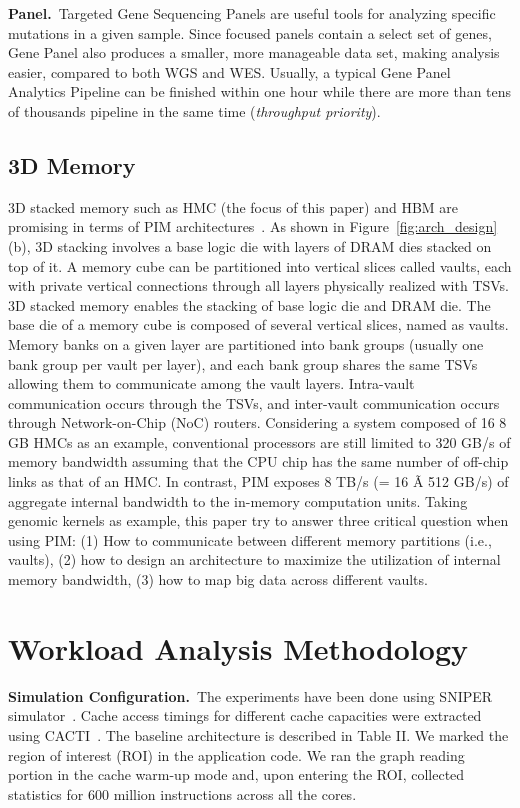 {\bf Panel.}~Targeted Gene Sequencing Panels are useful tools for analyzing specific mutations in a given sample. Since focused panels contain a select set of genes, Gene Panel also produces a smaller, more manageable data set, making analysis easier, compared to both WGS and WES. Usually, a typical Gene Panel Analytics Pipeline can be finished within one hour while there are more than tens of thousands pipeline in the same time ({\em throughput priority}).

\subsection{3D Memory}
3D stacked memory such as HMC (the focus of this paper) and HBM are promising in terms of PIM architectures~\cite{3Dstacking}. As shown in Figure~\ref{fig:arch_design}(b), 3D stacking involves a base logic die with layers of DRAM dies stacked on top of it. A memory cube can be partitioned into vertical slices called vaults, each with private vertical connections through all layers physically realized with TSVs. 3D stacked memory enables the stacking of base logic die and DRAM die. The base die of a memory cube is composed of several vertical slices, named as vaults. Memory banks on a given layer are partitioned into bank groups (usually one bank group per vault per layer), and each bank group shares the same TSVs allowing them to communicate among the vault layers. Intra-vault communication occurs through the TSVs, and inter-vault communication occurs through Network-on-Chip (NoC) routers. Considering a system composed of 16 8 GB HMCs as an example, conventional processors are still limited to 320 GB/s of memory bandwidth assuming that the CPU chip has the same number of off-chip links as that of an HMC. In contrast, PIM exposes 8 TB/s (= 16 Ã 512 GB/s) of aggregate internal bandwidth to the in-memory computation units. Taking genomic kernels as example, this paper try to answer three critical question when using PIM: (1) How to communicate between different memory partitions (i.e., vaults), (2) how to design an architecture to maximize the utilization of internal memory bandwidth, (3) how to map big data across different vaults.

\section{Workload Analysis Methodology}

\textbf{Simulation Configuration.}~The experiments have been done using SNIPER simulator~\cite{sniper}. Cache access timings for different cache capacities were extracted using CACTI~\cite{CACTI_5.3}. The baseline architecture is described in Table II. We marked the region of interest (ROI) in the application code. We ran the graph reading portion in the cache warm-up mode and, upon entering the ROI, collected statistics for 600 million instructions across all the cores.

